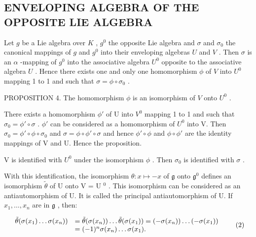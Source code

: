 \subsection{ENVELOPING ALGEBRA OF THE OPPOSITE LIE ALGEBRA}

Let \(g\) be a Lie algebra over \(K\) , \(g^0\) the opposite Lie algebra and \(\sigma\) and \(\sigma_0\) the canonical mappings of \(g\) and \(g^0\) into their enveloping algebras \(U\) and \(V\) . Then \(\sigma\) is an \(\alpha\) -mapping of \(g^0\) into the associative algebra \(U^0\) opposite to the associative algebra \(U\) . Hence there exists one and only one homomorphism \(\phi\) of \(V\) into \(U^0\) mapping 1 to 1 and such that \(\sigma = \phi \circ \sigma_0\) .

PROPOSITION 4. The homomorphism \(\phi\) is an isomorphism of \(V\) onto \(U^0\) .

There exists a homomorphism \(\phi'\) of U into \(V^0\) mapping 1 to 1 and such that \(\sigma_0 = \phi' \circ \sigma\) . \(\phi'\) can be considered as a homomorphism of \(U^0\) into V. Then \(\sigma_0 = \phi' \circ \phi \circ \sigma_0\) and \(\sigma = \phi \circ \phi' \circ \sigma\) and hence \(\phi' \circ \phi\) and \(\phi \circ \phi'\) are the identity mappings of V and U. Hence the proposition.

V is identified with \(U^{0}\) under the isomorphism \(\phi\) . Then \(\sigma_{0}\) is identified with \(\sigma\) .

With this identification, the isomorphism \(\theta: x \mapsto -x\) of \(\mathfrak{g}\) onto \(\mathfrak{g}^0\) defines an isomorphism \(\tilde{\theta}\) of U onto V = U \(^0\) . This isomorphism can be considered as an antiautomorphism of U. It is called the principal antiautomorphism of U. If \(x_{1}, \ldots, x_{n}\) are in \(\mathfrak{g}\) , then:

\[
\begin{array}{r l} \tilde {\theta} (\sigma (x _ {1}) \dots \sigma (x _ {n})) & = \tilde {\theta} (\sigma (x _ {n})) \dots \tilde {\theta} (\sigma (x _ {1})) = (- \sigma (x _ {n})) \dots (- \sigma (x _ {1})) \\ & = (- 1) ^ {n} \sigma (x _ {n}) \dots \sigma (x _ {1}). \end{array}\tag{2}
\]

